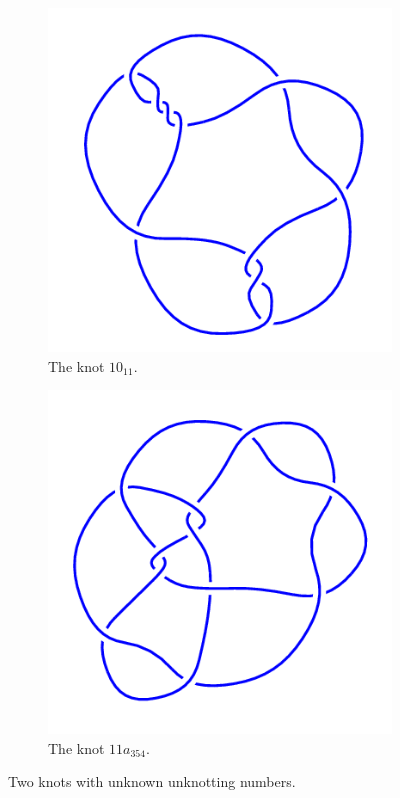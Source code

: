 \documentclass[12pt,letterpaper]{article}
\theoremstyle{definition}
\begin{document}
\begin{figure}[h!]
    \centering
    \begin{subfigure}{.4\textwidth}
        \centering
        \includegraphics[width=\textwidth]{rgp12pics/10_11.png}
        \caption{The knot $10_{11}$.}
    \end{subfigure}
    \hspace{1cm}
    \begin{subfigure}{.4\textwidth}
        \centering
        \includegraphics[width=\textwidth]{rgp12pics/11a_354.png}
        \caption{The knot $11a_{354}$.}
    \end{subfigure}
    \caption{Two knots with unknown unknotting numbers.}
\end{figure}
\end{document}
